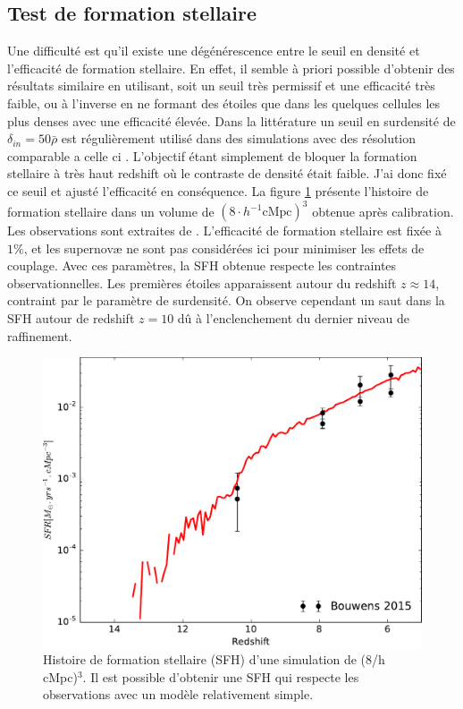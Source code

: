 \subsection{Test de formation stellaire}

Une difficulté est qu'il existe une dégénérescence entre le seuil en densité et l'efficacité de formation stellaire.
En effet, il semble à priori possible d'obtenir des résultats similaire en utilisant, soit un seuil très permissif et une efficacité très faible, ou à l'inverse en ne formant des étoiles que dans les quelques cellules les plus denses avec une efficacité élevée.
Dans la littérature un seuil en surdensité de $\delta_{in}=50\bar{\rho}$ est régulièrement utilisé dans des simulations avec des résolution comparable a celle ci \citep{ocvirk_cosmic_2015,stinson_star_2006}.
L'objectif étant simplement de bloquer la formation stellaire à très haut redshift où le contraste de densité était faible.
J'ai donc fixé ce seuil et ajusté l'efficacité en conséquence.
La figure \ref{fig:test_SFH} présente l'histoire de formation stellaire dans un volume de $\left( 8\cdot h^{-1} \mathrm{cMpc} \right)^3$ obtenue après calibration. 
Les observations sont extraites de \cite{bouwens_reionization_2015}.
L'efficacité de formation stellaire est fixée à $1\%$, et les supernovæ ne sont pas considérées ici pour minimiser les effets de couplage.
Avec ces paramètres, la \ac{SFH} obtenue respecte les contraintes observationnelles.
Les premières étoiles apparaissent autour du redshift $z\approx 14$, contraint par le paramètre de surdensité.
On observe cependant un saut dans la \ac{SFH} autour de redshift $z=10$ dû à l'enclenchement du dernier niveau de raffinement.

\begin{figure}
        \includegraphics[width=.95\linewidth]{img/02/SFR.pdf}
        \caption[Histoire de formation stellaire]{Histoire de formation stellaire (SFH) d'une simulation de (8/h cMpc)$^3$.
        Il est possible d'obtenir une SFH qui respecte les observations avec un modèle relativement simple.
}
 		\label{fig:test_SFH}
\end{figure}

